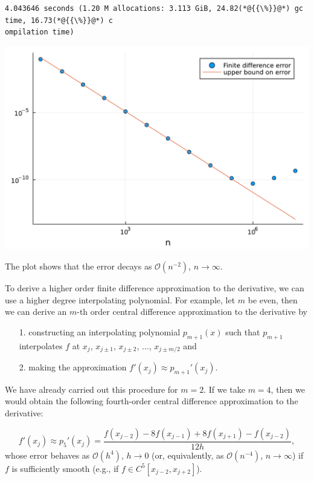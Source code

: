 \documentclass[12pt,a4paper]{article}
\begin{document}
\begin{lstlisting}
4.043646 seconds (1.20 M allocations: 3.113 GiB, 24.82(*@{{\%}}@*) gc time, 16.73(*@{{\%}}@*) c
ompilation time)
\end{lstlisting}

\includegraphics[width=\linewidth]{jl_q9oYGN/Chapter1_3_1.pdf}

The plot shows that the error decays as $\mathcal{O}(n^{-2})$, $n \to \infty$.

To derive a higher order finite difference approximation to the derivative, we can use a higher degree interpolating polynomial.  For example, let $m$ be even, then we can derive an $m$-th order central difference approximation to the derivative by 

\begin{itemize}
\item[1. ] constructing an interpolating polynomial $p_{m+1}(x)$ such that $p_{m+1}$ interpolates $f$ at $x_j$, $x_{j\pm 1}$, $x_{j\pm 2}$, $\ldots$,  $x_{j\pm m/2}$ and 


\item[2. ] making the approximation $f'(x_j) \approx p_{m+1}'(x_j)$. 

\end{itemize}
We have already carried out this procedure for $m = 2$. If we take $m = 4$, then we would obtain the following fourth-order central difference approximation to the derivative:

\[
f'(x_j) \approx p_5'(x_j) = \frac{f(x_{j-2}) -8 f(x_{j-1}) + 8 f(x_{j+1}) - f(x_{j-2})}{12h},
\]
whose error behaves as $\mathcal{O}(h^4)$, $h \to 0$ (or, equivalently, as $\mathcal{O}(n^{-4})$, $n \to \infty$) if $f$ is sufficiently smooth (e.g., if $f \in C^5[x_{j-2}, x_{j+2}]$).
\end{document}
